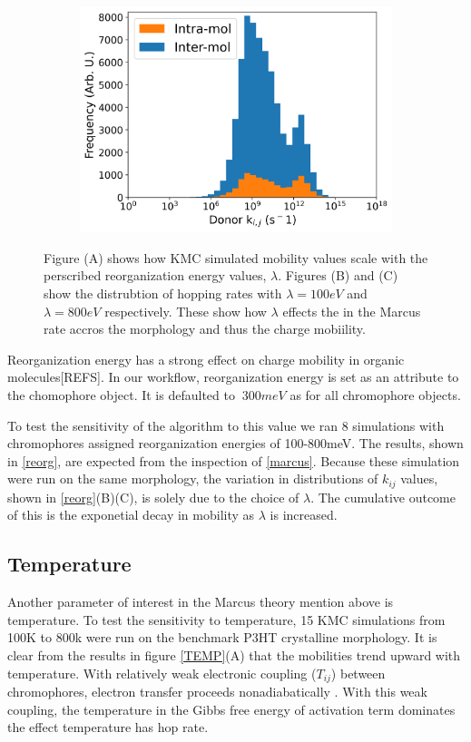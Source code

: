 \begin{figure}
\begin{subfigure}{.5\textwidth}
    \includegraphics[width=\textwidth]{figures/donor_hopping_rate_clusters_reorg800.png}
\end{subfigure}
    \caption[short]{Figure (A) shows how KMC simulated mobility values scale with the perscribed
    reorganization energy values, $\lambda$. Figures (B) and (C) show the distrubtion of hopping rates with
    $\lambda = 100eV$ and $\lambda = 800eV$ respectively. These show how $\lambda$ effects the in the Marcus
    rate accros the morphology and thus the charge mobiility.}
\label{reorg}
\end{figure}

Reorganization energy has a strong effect on charge mobility in organic
molecules[REFS]. In our workflow, reorganization energy is set as an attribute
to the chomophore object. It is defaulted to $~300meV$ as for all chromophore
objects.

To test the sensitivity of the algorithm to this value we ran 8
simulations with chromophores assigned reorganization energies of 100-800meV. The results, shown in
\autoref{reorg}, are expected from the inspection of \autoref{marcus}. Because these simulation were run on
the same morphology, the variation in distributions of $k_{ij}$ values, shown in \autoref{reorg}(B)(C), is
solely due to the choice of $\lambda$. The cumulative outcome of this is the exponetial decay in mobility as
$\lambda$ is increased.

\subsection{Temperature}

Another parameter of interest in the Marcus theory mention above is temperature. To test the sensitivity to
temperature, 15 KMC simulations from 100K to 800k were run on the benchmark P3HT crystalline morphology. It
is clear from the results in figure \ref{TEMP}(A) that the mobilities trend upward with temperature. With relatively
weak electronic coupling ($T_{ij}$) between chromophores, electron transfer proceeds nonadiabatically
\cite{clarke2010}. With this weak coupling, the temperature in the Gibbs free energy of activation term
dominates the effect temperature has hop rate.

